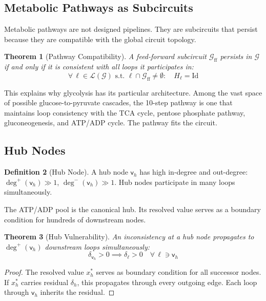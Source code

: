 \documentclass[10pt,twocolumn,a4paper]{article}
\theoremstyle{plain}
\newtheorem{theorem}{Theorem}[section]
\theoremstyle{definition}
\newtheorem{definition}[theorem]{Definition}
\theoremstyle{remark}
\newcommand{\fnode}{\mathsf{v}}
\newcommand{\circuit}{\mathcal{G}}
\begin{document}
\subsection{Metabolic Pathways as Subcircuits}

Metabolic pathways are not designed pipelines. They are subcircuits that persist because they are compatible with the global circuit topology.

\begin{theorem}[Pathway Compatibility]
\label{thm:compatibility}
A feed-forward subcircuit $\circuit_{\mathrm{ff}}$ persists in $\circuit$ if and only if it is consistent with all loops it participates in:
\begin{equation}
    \forall\, \ell \in \mathcal{L}(\circuit) \text{ s.t. } \ell \cap \circuit_{\mathrm{ff}} \neq \emptyset: \quad H_\ell = \mathrm{Id}
\end{equation}
\end{theorem}

This explains why glycolysis has its particular architecture. Among the vast space of possible glucose-to-pyruvate cascades, the 10-step pathway is one that maintains loop consistency with the TCA cycle, pentose phosphate pathway, gluconeogenesis, and ATP/ADP cycle. The pathway fits the circuit.

\subsection{Hub Nodes}

\begin{definition}[Hub Node]
\label{def:hub}
A hub node $\fnode_h$ has high in-degree and out-degree: $\deg^+(\fnode_h) \gg 1$, $\deg^-(\fnode_h) \gg 1$. Hub nodes participate in many loops simultaneously.
\end{definition}

The ATP/ADP pool is the canonical hub. Its resolved value serves as a boundary condition for hundreds of downstream nodes.

\begin{theorem}[Hub Vulnerability]
\label{thm:hub_vulnerability}
An inconsistency at a hub node propagates to $\deg^+(\fnode_h)$ downstream loops simultaneously:
\begin{equation}
    \delta_{\fnode_h} > 0 \implies \delta_\ell > 0 \quad \forall\, \ell \ni \fnode_h
\end{equation}
\end{theorem}

\begin{proof}
The resolved value $x_h^*$ serves as boundary condition for all successor nodes. If $x_h^*$ carries residual $\delta_h$, this propagates through every outgoing edge. Each loop through $\fnode_h$ inherits the residual.
\end{proof}
\end{document}
